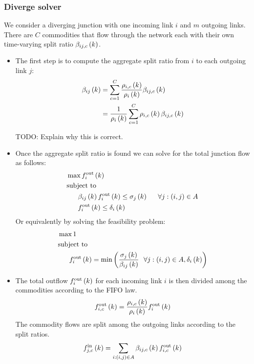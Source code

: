 \subsubsection{Diverge solver} 
\label{sec:divergeSolver}
We consider a diverging junction with one incoming link $i$ and $m$ outgoing links. There are $C$ commodities that flow through the network each with their own time-varying split ratio $\splitratio{i}{j}{k}{c}$. 	

\begin{itemize}
\item The first step is to compute the aggregate split ratio from $i$ to each outgoing link $j$:
	\begin{align*}
	\aggsplitratio{i}{j}{k} &= \sum_{c=1}^C \frac{\densitymc{i}{k}{c}}{\density{i}{k}}\splitratio{i}{j}{k}{c}\\
							&=  \frac{1}{\density{i}{k}} \sum_{c=1}^C \densitymc{i}{k}{c}\splitratio{i}{j}{k}{c}
	\end{align*} 

	TODO: Explain why this is correct.

\item Once the aggregate split ratio is found we can solve for the total junction flow as follows:
	\begin{align*}
	&\max \flowout{i}{k} \\
	&\text{subject to} \\
	&\ \ \ \ \ \aggsplitratio{i}{j}{k} \flowout{i}{k} \le{\cellsupply{j}{k}} \ \ \ \ \ \forall{j:(i,j)\in A}\\
	&\ \ \ \ \ \flowout{i}{k} \le{\celldemand{i}{k}}
	\end{align*}
	Or equivalently by solving the feasibility problem:
	\begin{align*}
	&\max 1 \\
	&\text{subject to} \\
	&\ \ \ \ \ \flowout{i}{k} = \min\left(\frac{\cellsupply{j}{k}}{\aggsplitratio{i}{j}{k}} \ \ \forall{j:(i,j)\in A}, \celldemand{i}{k}\right)
	\end{align*}

\item The total outflow $\flowout{i}{k}$ for each incoming link $i$ is then divided among the commodities according to the FIFO law.
	\begin{align*}
	\flowoutmc{i}{k}{c} &= \frac{\densitymc{i}{k}{c}}{\density{i}{k}}\flowout{i}{k}\\
	\end{align*} 
	The commodity flows are split among the outgoing links according to the split ratios.
	\begin{align*}
	\flowinmc{j}{k}{c} &= \sum_{i:(i,j)\in A} \splitratio{i}{j}{k}{c} \flowoutmc{i}{k}{c}\\
	\end{align*} 

\end{itemize}

